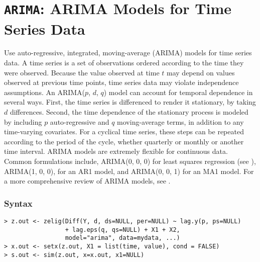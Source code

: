\section{{\tt ARIMA}: ARIMA Models for Time Series Data}
\label{ARIMA} 

Use auto-regressive, integrated, moving-average (ARIMA) models for
time series data.  A time series is a set of observations ordered
according to the time they were observed.  Because the value observed
at time $t$ may depend on values observed at previous time points,
time series data may violate independence assumptions.  An ARIMA($p$,
$d$, $q$) model can account for temporal dependence in several ways.
First, the time series is differenced to render it stationary, by
taking $d$ differences.  Second, the time dependence of the stationary
process is modeled by including $p$ auto-regressive and $q$
moving-average terms, in addition to any time-varying covariates.  For
a cyclical time series, these steps can be repeated according to the
period of the cycle, whether quarterly or monthly or another time
interval.  ARIMA models are extremely flexible for continuous data.
Common formulations include, ARIMA(0, 0, 0) for least squares
regression (see ), ARIMA(1, 0, 0), for an AR1 model, and
ARIMA(0, 0, 1) for an MA1 model.  For a more comprehensive review of
ARIMA models, see \cite{Enders04}.

\subsubsection*{Syntax}
\begin{verbatim}
> z.out <- zelig(Diff(Y, d, ds=NULL, per=NULL) ~ lag.y(p, ps=NULL) 
                 + lag.eps(q, qs=NULL) + X1 + X2, 
                 model="arima", data=mydata, ...)
> x.out <- setx(z.out, X1 = list(time, value), cond = FALSE) 
> s.out <- sim(z.out, x=x.out, x1=NULL)
\end{verbatim}

